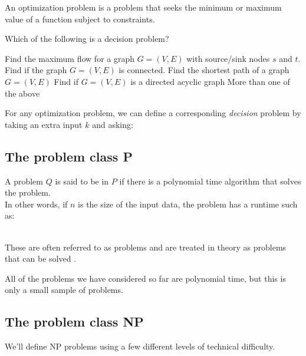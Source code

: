 \documentclass[11  pt]{article}
\begin{document}
	An optimization problem is a problem that seeks the minimum or maximum value of a function subject to constraints. \\
	
		\begin{Qu}
		Which of the following is a decision problem?
		\begin{itemize}
			\aitem Find the maximum flow for a graph $G = (V,E)$ with source/sink nodes $s$ and $t$.
			\bitem Find if the graph $G = (V,E)$ is connected.
			\citem Find the shortest path of a graph $G = (V,E)$
			\ditem Find if $G = (V,E)$ is a directed acyclic graph
			\eitem More than one of the above
		\end{itemize}
	\end{Qu}

	
		For any optimization problem, we can define a corresponding \emph{decision} problem by taking an extra input $k$ and asking:
	
	\vfill

	\newpage

	\subsection{The problem class P}
	A problem $Q$ is said to be in $P$ if there is a polynomial time algorithm that solves the problem. \\
	
	
	In other words, if $n$ is the size of the input data, the problem has a runtime such as: \\ \\
	
		\vs{2cm}
		
	These are often referred to as  problems and are treated in theory as problems that can be solved . \\
	
	\vs{10cm}
	
	All of the problems we have considered so far are polynomial time, but this is only a small sample of problems. \\
	
	
	\newpage
	\subsection{The problem class NP}
	We'll define NP problems using a few different levels of technical difficulty.
	
\end{document}
